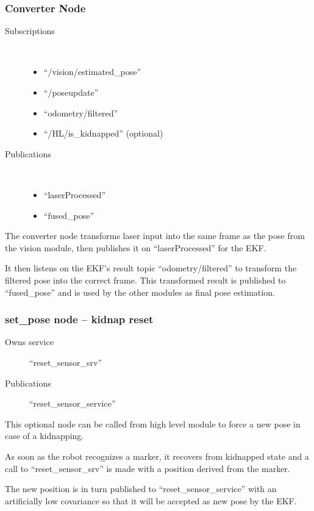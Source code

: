 \subsubsection{Converter Node}
\begin{description}
\item[Subscriptions]\
	\begin{itemize}
	\item ``/vision/estimated\_pose'' 
	\item ``/poseupdate'' 
	\item ``odometry/filtered'' 
	\item ``/HL/is\_kidnapped'' (optional)
	\end{itemize}
	
\item[Publications]\
	\begin{itemize}
	\item ``laserProcessed''
	\item ``fused\_pose''
	\end{itemize}
\end{description}

The converter node transforms laser input into the same frame as the pose from the vision module, then publishes it on ``laserProcessed'' for the EKF.

It then listens on the EKF's result topic ``odometry/filtered'' to transform the filtered pose into the correct frame. This transformed result is published to ``fused\_pose'' and is used by the other modules as final pose estimation.

\subsubsection{set\_pose node -- kidnap reset}
\begin{description}
\item[Owns service] ``reset\_sensor\_srv''
\item[Publications] ``reset\_sensor\_service''
\end{description}

This optional node can be called from high level module to force a new pose in case of a kidnapping.

As soon as the robot recognizes a marker, it recovers from kidnapped state and a call to ``reset\_sensor\_srv'' is made with a position derived from the marker.

The new position is in turn published to ``reset\_sensor\_service'' with an artificially low covariance so that it will be accepted as new pose by the EKF.

